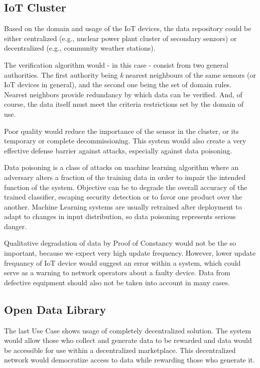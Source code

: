 \subsection{IoT Cluster}

Based on the domain and usage of the IoT devices, the data repository could be either centralized (e.g., nuclear power plant cluster of secondary senzors) or decentralized (e.g., community weather stations).

The verification algorithm would - in this case - consist from two general authorities.
The first authority being \textit{k} nearest neighbours of the same sensors (or IoT devices in general), and the second one being the set of domain rules.
Nearest neighbors provide redundancy by which data can be verified.
And, of course, the data itself must meet the criteria restrictions set by the domain of use.

Poor quality would reduce the importance of the sensor in the cluster, or its temporary or complete decommissioning.
This system would also create a very effective defense barrier against attacks, especially against data poisoning.

Data poisoning is a class of attacks on machine learning algorithm where an adversary alters a fraction of the training data in order to impair the intended function of the system.
Objective can be to degrade the overall accuracy of the trained classifier, escaping security detection or to favor one product over the another.
Machine Learning systems are usually retrained after deployment to adapt to changes in input distribution, so data poisoning represents serious danger.

Qualitative degradation of data by Proof of Constancy would not be the so important, because we expect very high update frequency.
However, lower update frequancy of IoT device would suggest an error within a system, which could serve as a warning to network operators about a faulty device.
Data from defective equipment should also not be taken into account in many cases.

\subsection{Open Data Library}

The last Use Case shows usage of completely decentralized solution.
The system would allow those who collect and generate data to be rewarded and data would be accessible for use within a decentralized marketplace.
This decentralized network would democratize access to data while rewarding those who generate it.

